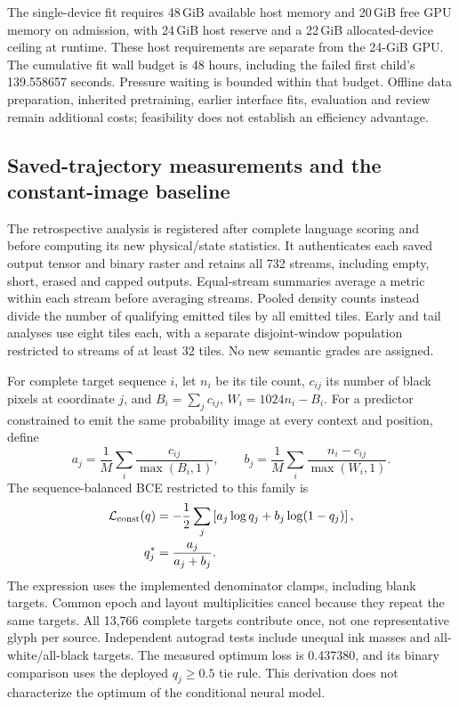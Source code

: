 \documentclass[12pt,a4paper]{article}
\providecommand{\DIFadd}[1]{{\protect\color{blue} \sf #1}} %
\begin{document}
\DIFadd{The single-device fit requires 48\,GiB available host memory and 20\,GiB free
GPU memory on admission, with 24\,GiB host reserve and a 22\,GiB allocated-device
ceiling at runtime. These host requirements are separate from the 24-GiB GPU.
The cumulative fit wall budget is 48 hours, including the failed first child's
139.558657 seconds. Pressure waiting is bounded within that budget. Offline data
preparation, inherited pretraining, earlier interface fits, evaluation and review
remain additional costs; feasibility does not establish an efficiency advantage.
}

\subsection*{\DIFadd{Saved-trajectory measurements and the constant-image baseline}}
\DIFadd{The retrospective analysis is registered after complete language scoring and
before computing its new physical/state statistics. It authenticates each
saved output tensor and binary raster and retains all 732 streams, including
empty, short, erased and capped outputs. Equal-stream summaries average a
metric within each stream before averaging streams. Pooled density counts
instead divide the number of qualifying emitted tiles by all emitted tiles.
Early and tail analyses use eight tiles each, with a separate disjoint-window
population restricted to streams of at least 32 tiles. No new semantic grades
are assigned.
}

\DIFadd{For complete target sequence $i$, let $n_i$ be its tile count, $c_{ij}$ its
number of black pixels at coordinate $j$, and $B_i=\sum_j c_{ij}$,
$W_i=1024n_i-B_i$. For a predictor constrained to emit the same probability
image at every context and position, define
}\begin{equation}
 a_j=\frac{1}{M}\sum_i\frac{c_{ij}}{\max(B_i,1)},\qquad
 b_j=\frac{1}{M}\sum_i\frac{n_i-c_{ij}}{\max(W_i,1)}.
 \label{eq:constant-writing-weights}
\end{equation}
\DIFadd{The sequence-balanced BCE restricted to this family is
}\begin{equation}
 \begin{aligned}
 \mathcal L_{\rm const}(q)&=-\frac{1}{2}\sum_j
 \left[a_j\log q_j+b_j\log(1-q_j)\right],\\
 q_j^*&=\frac{a_j}{a_j+b_j}.
 \end{aligned}
 \label{eq:constant-writing-optimum}
\end{equation}
\DIFadd{The expression uses the implemented denominator clamps, including blank targets.
Common epoch and layout multiplicities cancel because they repeat the same
targets. All 13,766 complete targets contribute once, not one representative
glyph per source. Independent autograd tests include unequal ink masses and
all-white/all-black targets. The measured optimum loss is 0.437380, and its
binary comparison uses the deployed $q_j\geq0.5$ tie rule. This derivation
does not characterize the optimum of the conditional neural model.
}
\end{document}

